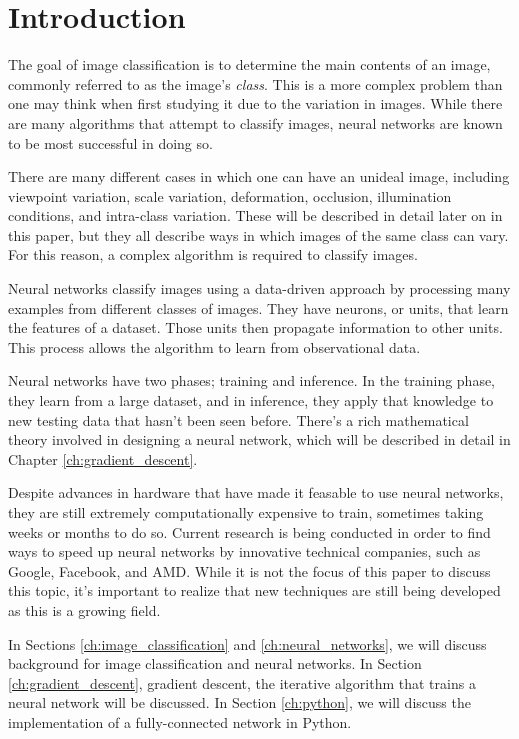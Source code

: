 \newpage
\section{Introduction}

The goal of image classification is to determine the main contents of an image,
commonly referred to as the image's \textit{class}. This is a more complex
problem than one may think when first studying it due to the variation in
images. While there are many algorithms that attempt to classify images, neural
networks are known to be most successful in doing so.

There are many different cases in which one can have an unideal image,
including viewpoint variation, scale variation, deformation, occlusion,
illumination conditions, and intra-class variation. These will be described in
detail later on in this paper, but they all describe ways in which images of
the same class can vary. For this reason, a complex algorithm is required to
classify images.

Neural networks classify images using a data-driven approach by processing many
examples from different classes of images. They have neurons, or units, that
learn the features of a dataset. Those units then propagate information to
other units. This process allows the algorithm to learn from observational
data.

Neural networks have two phases; training and inference. In the training phase,
they learn from a large dataset, and in inference, they apply that knowledge to
new testing data that hasn't been seen before. There's a rich mathematical
theory involved in designing a neural network, which will be described in
detail in Chapter \ref{ch:gradient_descent}.

Despite advances in hardware that have made it feasable to use neural networks,
they are still extremely computationally expensive to train, sometimes taking
weeks or months to do so. Current research is being conducted in order to find
ways to speed up neural networks by innovative technical companies, such as
Google, Facebook, and AMD. While it is not the focus of this paper to discuss
this topic, it's important to realize that new techniques are still being
developed as this is a growing field.

In Sections \ref{ch:image_classification} and \ref{ch:neural_networks}, we will
discuss background for image classification and neural networks. In Section
\ref{ch:gradient_descent}, gradient descent, the iterative algorithm that
trains a neural network will be discussed. In Section \ref{ch:python}, we will
discuss the implementation of a fully-connected network in Python.
